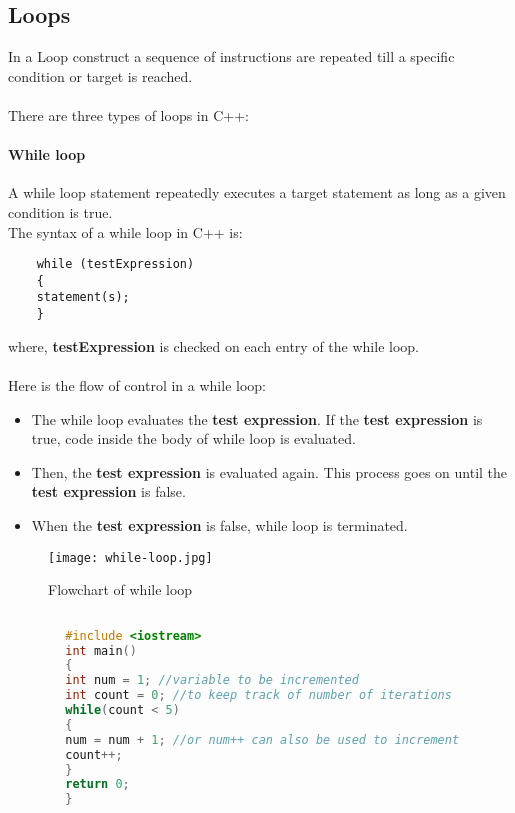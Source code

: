 \documentclass[11pt,fleqn]{book} %
\begin{document}
	\subsection{Loops}
	In a Loop construct a sequence of instructions are repeated till a specific condition or target is reached. ~\\ ~\\
	There are three types of loops in C++: 
	\paragraph{While loop}
	A while loop statement repeatedly executes a target statement as long as a given condition is true. ~\\
	The syntax of a while loop in C++ is:
	\begin{lstlisting}
	while (testExpression) 
	{
	statement(s);
	}
	\end{lstlisting}
	where, \textbf{testExpression} is checked on each entry of the while loop.
	~\\ \\
	Here is the flow of control in a while loop: \\
	\begin{itemize}
		\item The while loop evaluates the \textbf{test expression}.
		If the \textbf{test expression} is true, code inside the body of while loop is evaluated.
		\item Then, the \textbf{test expression} is evaluated again. This process goes on until the \textbf{test expression} is false.
		\item When the \textbf{test expression} is false, while loop is terminated.
	\end{itemize}
	\begin{figure}[H]
		\centering
		\texttt{[image: while-loop.jpg]}
		\caption{Flowchart of while loop}
	\end{figure}
	\begin{example}
		\begin{lstlisting}[language=C++, caption = Using While loop to increment an integer 5 times]
		
		#include <iostream>
		int main()
		{
		int num = 1; //variable to be incremented
		int count = 0; //to keep track of number of iterations
		while(count < 5)
		{
		num = num + 1; //or num++ can also be used to increment
		count++;
		}
		return 0;
		}
		\end{lstlisting}
	\end{example}
\end{document}
